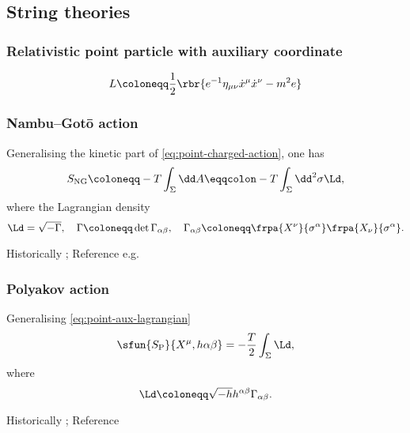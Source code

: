 \documentclass[a4paper,11pt]{article}
\begin{document}
\subsection{String theories}

\subsubsection*{Relativistic point particle with auxiliary coordinate}

\cite[sec.\ 2.1]{Blumenhagen2013}
\begin{equation}
L \coloneqq \frac{1}{2} \rbr{e^{-1}\eta_{\mu\nu}\dot{x}^\mu \dot{x}^\nu - m^2 e}
\label{eq:point-aux-lagrangian}
\end{equation}

\subsubsection*{Nambu--Gotō action}

Generalising the kinetic part of \eqref{eq:point-charged-action}, one has
\begin{equation}
S_\text{NG} \coloneqq -T \int_\Sigma \dd A
\eqqcolon -T \int_\Sigma\dd^2\sigma \Ld,
\end{equation}
where the Lagrangian density
\begin{equation}
\Ld = \sqrt{-\Gamma},\quad
\Gamma \coloneqq \det \Gamma_{\alpha\beta},\quad
\Gamma_{\alpha\beta} \coloneqq \frpa{X^\nu}{\sigma^\alpha} 
\frpa{X_\nu}{\sigma^\alpha}.
\end{equation}


Historically \cite{Nambu1970,Goto1971}; Reference e.g.\ 
\cite{Blumenhagen2013}
\cite[sec.\ 3.2]{Kiefer2012}

\subsubsection*{Polyakov action}

Generalising \eqref{eq:point-aux-lagrangian}
\begin{equation}
\sfun{S_\text{P}}{X^\mu, h{\alpha\beta}} = -\frac{T}{2}\int_\Sigma \Ld,
\end{equation}
where
\begin{equation}
\Ld \coloneqq \sqrt{-h} h^{\alpha\beta}\Gamma_{\alpha\beta}.
\end{equation}



Historically \cite{Brink1976,Deser1976,Polyakov1981};
Reference
\cite[sec.\ 3.2]{Kiefer2012}





\printbibliography
\end{document}

